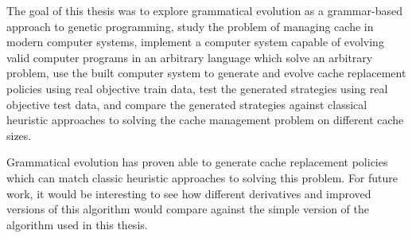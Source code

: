 The goal of this thesis was to explore grammatical evolution as a grammar-based approach to genetic programming, study the problem of managing cache in modern computer systems, implement a computer system capable of evolving valid computer programs in an arbitrary language which solve an arbitrary problem, use the built computer system to generate and evolve cache replacement policies using real objective train data, test the generated strategies using real objective test data, and compare the generated strategies against classical heuristic approaches to solving the cache management problem on different cache sizes.

Grammatical evolution has proven able to generate cache replacement policies which can match classic heuristic approaches to solving this problem. For future work, it would be interesting to see how different derivatives and improved versions of this algorithm would compare against the simple version of the algorithm used in this thesis.